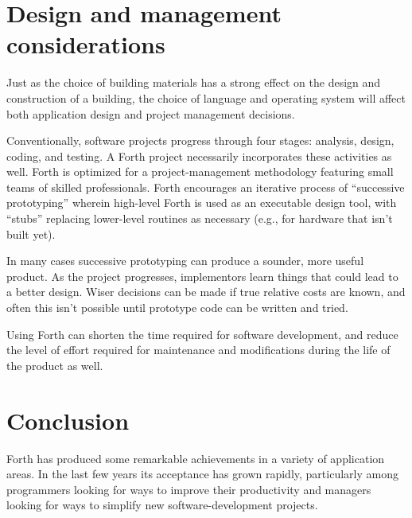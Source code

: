 \section{Design and management considerations} %

Just as the choice of building materials has a strong effect on the
design and construction of a building, the choice of language and
operating system will affect both application design and project
management decisions.

Conventionally, software projects progress through four stages:
analysis, design, coding, and testing. A Forth project necessarily
incorporates these activities as well. Forth is optimized for a
project-management methodology featuring small teams of skilled
professionals. Forth encourages an iterative process of ``successive
prototyping'' wherein high-level Forth is used as an executable
design tool, with ``stubs'' replacing lower-level routines as
necessary (e.g., for hardware that isn't built yet).

In many cases successive prototyping can produce a sounder, more
useful product. As the project progresses, implementors learn things
that could lead to a better design. Wiser decisions can be made if
true relative costs are known, and often this isn't possible until
prototype code can be written and tried.

Using Forth can shorten the time required for software development,
and reduce the level of effort required for maintenance and
modifications during the life of the product as well.


\section{Conclusion} %

Forth has produced some remarkable achievements in a variety of
application areas. In the last few years its acceptance has grown
rapidly, particularly among programmers looking for ways to improve
their productivity and managers looking for ways to simplify new
software-development projects.
